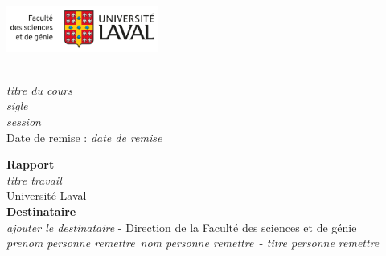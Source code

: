 \documentclass[12pt]{article}
\newcommand{\titreDuCours}{\textit{titre du cours}}
\newcommand{\sigleCours}{\textit{sigle}}
\newcommand{\session}{\textit{session}}
\newcommand{\titreTravail}{\textit{titre travail}}
\newcommand{\nomOrganisation}{Université Laval}
\newcommand{\dateRemise}{\textit{date de remise}}
\newcommand{\prenomSuperviseur}{\textit{prenom personne remettre}}
\newcommand{\nomSuperviseur}{\textit{nom personne remettre}}
\newcommand{\titreSuperviseur}{\textit{titre personne remettre}}
\newcommand{\distTitreTravailEtNom}{4cm}
\newcommand{\distanceTypeRapportEtDestinataire}{5cm}
\begin{document}
	\thispagestyle{empty}
	\begin{minipage}[t]{8.1cm}
		\vspace{0pt}
		\begin{flushleft}
			\hspace{-1cm}
			\includegraphics[width=5cm]{../img/UL-FSG-C-g-3lignes.png}
			\\
		\end{flushleft}
	\end{minipage}
	\begin{minipage}[t]{8.1cm}
		\begin{flushright}
			\hspace*{2cm} \\ \hspace*{1cm}\titreDuCours\\ \hspace*{1cm}\sigleCours\\ \hspace*{1cm}\session\\
			\hspace*{1cm} Date de remise : {\dateRemise}\\
		\end{flushright}
	\end{minipage}

	\vspace{\distTitreTravailEtNom}
	\begin{center}
		\fontsize{14.4}{14.4}\large \textbf{Rapport}\\
		\vspace{1cm}
		\large {\titreTravail} \\
		\vspace{0.2cm}
		{\nomOrganisation} \\
		\vspace{\distanceTypeRapportEtDestinataire}
		\fontsize{14.4}{14.4}\textbf{Destinataire}\\ \large \textit{ajouter le destinataire}
		- Direction de la Faculté des sciences et de génie \\
		\vspace{0,5cm}
		\large \prenomSuperviseur~\nomSuperviseur~- \titreSuperviseur \\
	\end{center}
	\vspace{3cm}
\end{document}
